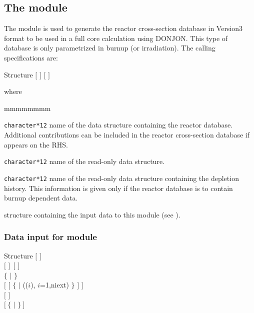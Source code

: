 \subsection{The  module}\label{sect:CPOData}

The  module is used to generate the reactor cross-section database in Version3 format to be used in a full core
calculation using DONJON. This type of database is only parametrized in burnup
(or irradiation). The calling specifications are:

\begin{DataStructure}{Structure }
 \moc{:=}   $[$  $]$  
$[$  $]$ \moc{::} 
\end{DataStructure}

\noindent
 where

\begin{ListeDeDescription}{mmmmmmmm}

\item[\dusa{CPONAM}] \verb|character*12| name of the  data structure containing the reactor
database. Additional contributions can be included in the reactor cross-section database if 
appears on the RHS.

\item[\dusa{EDINAM}] \verb|character*12| name of the read-only  data structure.

\item[\dusa{BRNNAM}] \verb|character*12| name of the read-only  data structure containing the
depletion history. This information is given only if the reactor database is to contain burnup dependent data.

\item[\dstr{desccpo}] structure containing the input data to this module (see ).
\end{ListeDeDescription}


\subsubsection{Data input for module }\label{sect:desccpo}

\begin{DataStructure}{Structure }
$[$   $]$ \\
$[$  $]~~[$  $]$ \\
$\{$   $|$   $\}$ \\
$[$ $[$   $\{$  $|$  (($i$), $i$=1,niext) $\}$ $]$ $]$ \\ 
$[$   $]$ \\
$[~\{$  $|$  $\}~]$
\end{DataStructure}

